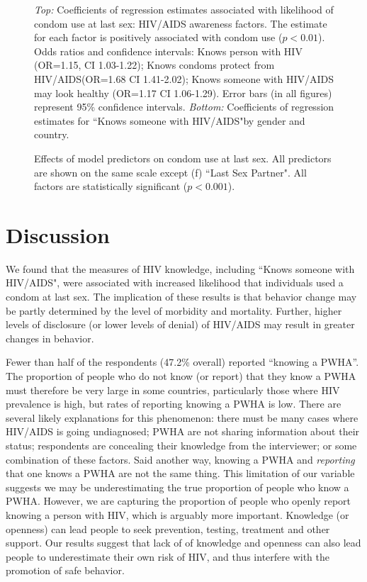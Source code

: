 \documentclass[10pt,letterpaper]{article}
\newcommand{\KnowsPWHA}{``Knows someone with HIV/AIDS"}
\begin{document}
\begin{figure}[!hbt]
\caption{\emph{Top:} Coefficients of regression estimates associated with likelihood of condom use at last sex: HIV/AIDS awareness factors. The estimate for each factor is positively associated with condom use ($p<0.01$). Odds ratios and confidence intervals: Knows person with HIV (OR=1.15, CI 1.03-1.22); Knows condoms protect from HIV/AIDS(OR=1.68 CI 1.41-2.02); Knows someone with HIV/AIDS may look healthy (OR=1.17 CI 1.06-1.29). Error bars (in all figures) represent 95\% confidence intervals. \emph{Bottom:} Coefficients of regression estimates for \KnowsPWHA by gender and country.
}
\label{combined_coefplot.fig}
\end{figure}
%
%
\begin{figure}[!hbt]
\caption{Effects of model predictors on condom use at last sex. All predictors are shown on the same scale except (f) ``Last Sex Partner". All factors are statistically significant ($p <0.001$).}
\label{panel_plot.fig}
\end{figure}


\section{Discussion}

We found that the measures of HIV knowledge, including \KnowsPWHA, were associated with increased likelihood that individuals used a condom at last sex.  The implication of these results is that behavior change may be partly determined by the level of morbidity and mortality. Further, higher levels of disclosure (or lower levels of denial) of HIV/AIDS may result in greater changes in behavior.

Fewer than half of the respondents (47.2\% overall) reported ``knowing a PWHA''. The proportion of people who do not know (or report) that they know a PWHA must therefore be very large in some countries, particularly those where HIV prevalence is high, but rates of reporting knowing a PWHA is low. There are several likely explanations for this phenomenon: there must be many cases where HIV/AIDS is going undiagnosed; PWHA are not sharing information about their status; respondents are concealing their knowledge from the interviewer; or some combination of these factors.  Said another way, knowing a PWHA and \emph{reporting} that one knows a PWHA are not the same thing. This limitation of our variable suggests we may be underestimating the true proportion of people who know a PWHA. However, we are capturing the proportion of people who openly report knowing a person with HIV, which is arguably more important. Knowledge (or openness) can lead people to seek prevention,  testing, treatment and other support.  Our results suggest that lack of of knowledge and openness can also lead people to underestimate their own risk of HIV, and thus interfere with the promotion of safe behavior.
\end{document}
